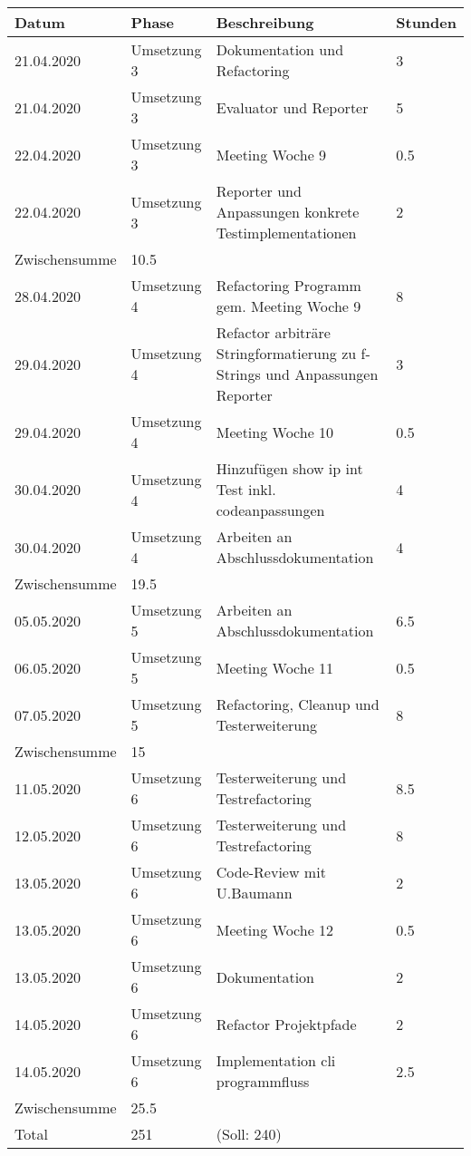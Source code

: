 \documentclass[
	ngerman,
	toc=listof, %
	toc=bibliography, %
	footnotes=multiple, %
	parskip=half, %
	numbers=noendperiod %
]{scrartcl}
\begin{document}
	\newpage

	\begin{tabularx}{\textwidth}{llXl}
		\toprule
		Datum & Phase & Beschreibung & Stunden \\
		\midrule
		21.04.2020 & Umsetzung 3 & Dokumentation und Refactoring & 3 \\
		21.04.2020 & Umsetzung 3 & Evaluator und Reporter & 5 \\
		22.04.2020 & Umsetzung 3 & Meeting Woche 9 & 0.5 \\
		22.04.2020 & Umsetzung 3 & Reporter und Anpassungen konkrete Testimplementationen & 2 \\
		\midrule
		Zwischensumme & 10.5 & & \\
		\midrule
		28.04.2020 & Umsetzung 4 & Refactoring Programm gem. Meeting Woche 9 & 8 \\
		29.04.2020 & Umsetzung 4 & Refactor arbiträre Stringformatierung zu f-Strings und Anpassungen Reporter & 3 \\
		29.04.2020 & Umsetzung 4 & Meeting Woche 10 & 0.5 \\
		30.04.2020 & Umsetzung 4 & Hinzufügen show ip int Test inkl. codeanpassungen & 4 \\
		30.04.2020 & Umsetzung 4 & Arbeiten an Abschlussdokumentation & 4 \\
		\midrule
		Zwischensumme & 19.5 & & \\
		\midrule
		05.05.2020 & Umsetzung 5 & Arbeiten an Abschlussdokumentation & 6.5 \\
		06.05.2020 & Umsetzung 5 & Meeting Woche 11 & 0.5 \\
		07.05.2020 & Umsetzung 5 & Refactoring, Cleanup und Testerweiterung & 8 \\
		\midrule
		Zwischensumme & 15 & & \\
		\midrule
		11.05.2020 & Umsetzung 6 & Testerweiterung und Testrefactoring & 8.5 \\
		12.05.2020 & Umsetzung 6 & Testerweiterung und Testrefactoring & 8 \\
		13.05.2020 & Umsetzung 6 & Code-Review mit U.Baumann & 2 \\
		13.05.2020 & Umsetzung 6 & Meeting Woche 12 & 0.5 \\
		13.05.2020 & Umsetzung 6 & Dokumentation & 2 \\
		14.05.2020 & Umsetzung 6 & Refactor Projektpfade & 2 \\
		14.05.2020 & Umsetzung 6 & Implementation cli programmfluss & 2.5\\
		\midrule
		Zwischensumme & 25.5 & & \\ 

		\midrule
		Total & 251 & (Soll: 240) & \\
		\bottomrule
	\end{tabularx}
\end{document}
